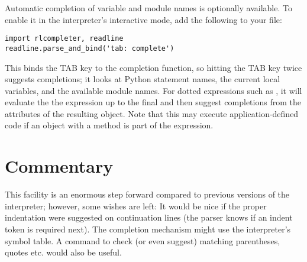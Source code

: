 \documentclass{manual}
\begin{document}
Automatic completion of variable and module names is optionally
available.  To enable it in the interpreter's interactive mode, add
the following to your  file:%

\begin{verbatim}
import rlcompleter, readline
readline.parse_and_bind('tab: complete')
\end{verbatim}

This binds the TAB key to the completion function, so hitting the TAB
key twice suggests completions; it looks at Python statement names,
the current local variables, and the available module names.  For
dotted expressions such as , it will evaluate the the
expression up to the final  and then suggest completions
from the attributes of the resulting object.  Note that this may
execute application-defined code if an object with a
 method is part of the expression.


\section{Commentary \label{commentary}}

This facility is an enormous step forward compared to previous
versions of the interpreter; however, some wishes are left: It would
be nice if the proper indentation were suggested on continuation lines
(the parser knows if an indent token is required next).  The
completion mechanism might use the interpreter's symbol table.  A
command to check (or even suggest) matching parentheses, quotes etc.
would also be useful.

\end{document}

